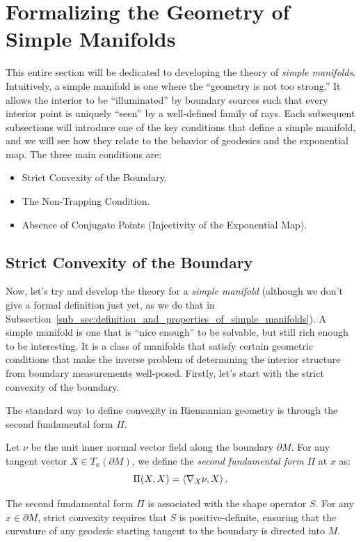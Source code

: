 \section{Formalizing the Geometry of Simple Manifolds}
\label{sec:formalizing_the_geometry_of_simple_manifolds}

This entire section will be dedicated to developing the theory of \emph{simple manifolds}. Intuitively, a simple manifold is one where the ``geometry is not too strong.'' It allows the interior to be ``illuminated'' by boundary sources such that every interior point is uniquely ``seen'' by a well-defined family of rays. Each subsequent subsections will introduce one of the key conditions that define a simple manifold, and we will see how they relate to the behavior of geodesics and the exponential map. The three main conditions are:
\begin{itemize}
  \item Strict Convexity of the Boundary.
  \item The Non-Trapping Condition.
  \item Absence of Conjugate Points (Injectivity of the Exponential Map).
\end{itemize}

\subsection{Strict Convexity of the Boundary} Now, let's try and develop the theory for a \emph{simple manifold} (although we don't give a formal definition just yet, as we do that in Subsection~\ref{sub_sec:definition_and_properties_of_simple_manifolds}). A simple manifold is one that is ``nice enough'' to be solvable, but still rich enough to be interesting. It is a class of manifolds that satisfy certain geometric conditions that make the inverse problem of determining the interior structure from boundary measurements well-posed. Firstly, let's start with the strict convexity of the boundary.

The standard way to define convexity in Riemannian geometry is through the second fundamental form $\Pi$.
\begin{definition}
  Let $\nu$ be the unit inner normal vector field along the boundary $\partial M$. For any tangent vector $X \in T_x(\partial M)$, we define the \emph{second fundamental form} $\Pi$ at $x$ as:
  \[%
    \Pi(X, X) = \braket{\nabla_X \nu, X}
  .\]%
\end{definition}
The second fundamental form $\Pi$ is associated with the shape operator $S$. For any $x \in \partial M$, strict convexity requires that $S$ is positive-definite, ensuring that the curvature of any geodesic starting tangent to the boundary is directed into $M$.

